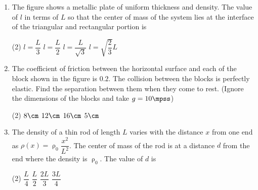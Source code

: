 \documentclass{article}
\renewcommand{\ans}{\quad}
\begin{document}
\begin{enumerate}
    \item The figure shows a metallic plate of uniform thickness and density. The value of $l$ in terms of $L$ so that the center of mass of the system lies at the interface of the triangular and rectangular portion is
    \begin{center}
    \end{center}
    \begin{tasks}(2)
        \task $l=\dfrac{L}{3}$
        \task $l=\dfrac{L}{2}$
        \task $l=\dfrac{L}{\sqrt{3}}$\ans
        \task $l=\sqrt{\dfrac{2}{3}}L$
    \end{tasks}


    \item The coefficient of friction between the horizontal surface and each of the block shown in the figure is $0.2$. The collision between the blocks is perfectly elastic. Find the separation between them when they come to rest. (Ignore the dimensions of the blocks and take $g=10\mpss$)
    \begin{center}
    \end{center}
    \begin{tasks}(2)
        \task $8\cm$
        \task $12\cm$
        \task $16\cm$
        \task $5\cm$\ans
    \end{tasks}


    \item The density of a thin rod of length $L$ varies with the distance $x$ from one end as $\rho(x)=\uprho_0\dfrac{x^2}{L^2}$. The center of mass of the rod is at a distance $d$ from the end where the density is $\uprho_0$. The value of $d$ is
    \begin{center}
        \end{center}
    \begin{tasks}(2)
        \task $\dfrac{L}{4}$\ans
        \task $\dfrac{L}{2}$
        \task $\dfrac{2L}{3}$
        \task $\dfrac{3L}{4}$
    \end{tasks}


\end{enumerate}
\end{document}
